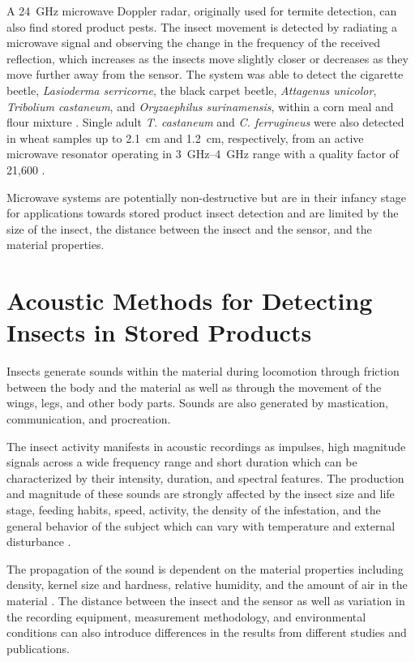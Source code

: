 \documentclass[../Vibro-Acoustic Signatures and Detection Algorithms for Stored Product Insects.tex]{subfiles}
\begin{document}
A \SI{24}{\giga\hertz} microwave Doppler radar, originally used for termite detection, can also find stored product pests. The insect movement is detected by radiating a microwave signal and observing the change in the frequency of the received reflection, which increases as the insects move slightly closer or decreases as they move further away from the sensor. The system was able to detect the cigarette beetle, \textit{Lasioderma serricorne}, the black carpet beetle, \textit{Attagenus unicolor}, \textit{Tribolium castaneum}, and \textit{Oryzaephilus surinamensis}, within a corn meal and flour mixture \cite{mankinMicrowaveRadarDetection2004}. Single adult \textit{T. castaneum} and \textit{C. ferrugineus} were also detected in wheat samples up to \SI{2.1}{\centi\meter} and \SI{1.2}{\centi\meter}, respectively, from an active microwave resonator operating in \SIrange{3}{4}{\giga\hertz} range with a quality factor of 21,600 \cite{reimerCompactMicrowaveDevice2018}.

Microwave systems are potentially non-destructive but are in their infancy stage for applications towards stored product insect detection and are limited by the size of the insect, the distance between the insect and the sensor, and the material properties.

\newpage
\section{Acoustic Methods for Detecting Insects in Stored Products}

Insects generate sounds within the material during locomotion through friction between the body and the material as well as through the movement of the wings, legs, and other body parts. Sounds are also generated by mastication, communication, and procreation.

The insect activity manifests in acoustic recordings as impulses, high magnitude signals across a wide frequency range and short duration which can be characterized by their intensity, duration, and spectral features. The production and magnitude of these sounds are strongly affected by the insect size and life stage, feeding habits, speed, activity, the density of the infestation, and the general behavior of the subject which can vary with temperature and external disturbance \cite{mankinPerspectivePromiseCentury2011}.

The propagation of the sound is dependent on the material properties including density, kernel size and hardness, relative humidity, and the amount of air in the material \cite{mankinPerspectivePromiseCentury2011}. The distance between the insect and the sensor as well as variation in the recording equipment, measurement methodology, and environmental conditions can also introduce differences in the results from different studies and publications.
\end{document}
